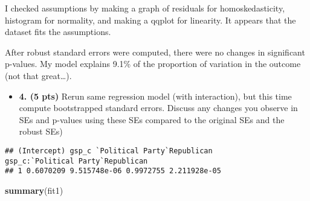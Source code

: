 \documentclass[]{article}
\newenvironment{Shaded}{\begin{snugshade}}{\end{snugshade}}
\newcommand{\CommentTok}[1]{\textcolor[rgb]{0.56,0.35,0.01}{\textit{#1}}}
\newcommand{\DataTypeTok}[1]{\textcolor[rgb]{0.13,0.29,0.53}{#1}}
\newcommand{\DecValTok}[1]{\textcolor[rgb]{0.00,0.00,0.81}{#1}}
\newcommand{\KeywordTok}[1]{\textcolor[rgb]{0.13,0.29,0.53}{\textbf{#1}}}
\newcommand{\NormalTok}[1]{#1}
\newcommand{\OperatorTok}[1]{\textcolor[rgb]{0.81,0.36,0.00}{\textbf{#1}}}
\newcommand{\StringTok}[1]{\textcolor[rgb]{0.31,0.60,0.02}{#1}}
\providecommand{\tightlist}{%
  \setlength{\itemsep}{0pt}\setlength{\parskip}{0pt}}
\begin{document}
I checked assumptions by making a graph of residuals for
homoskedasticity, histogram for normality, and making a qqplot for
linearity. It appears that the dataset fits the assumptions.

After robust standard errors were computed, there were no changes in
significant p-values. My model explains 9.1\% of the proportion of
variation in the outcome (not that great\ldots{}).

\begin{itemize}
\tightlist
\item
  \textbf{4. (5 pts)} Rerun same regression model (with interaction),
  but this time compute bootstrapped standard errors. Discuss any
  changes you observe in SEs and p-values using these SEs compared to
  the original SEs and the robust SEs)
\end{itemize}

\begin{Shaded}
\end{Shaded}

\begin{verbatim}
## (Intercept) gsp_c `Political Party`Republican
gsp_c:`Political Party`Republican
## 1 0.6070209 9.515748e-06 0.9972755 2.211928e-05
\end{verbatim}

\begin{Shaded}
\begin{Highlighting}[]
\KeywordTok{summary}\NormalTok{(fit1)}
\end{Highlighting}
\end{Shaded}
\end{document}
